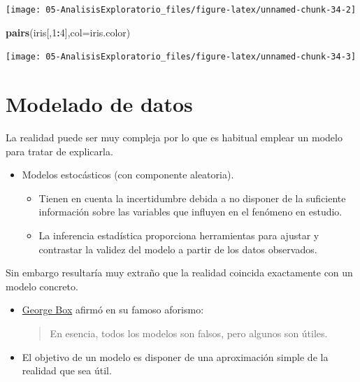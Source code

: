 \documentclass[]{book}
\newenvironment{Shaded}{\begin{snugshade}}{\end{snugshade}}
\newcommand{\KeywordTok}[1]{\textcolor[rgb]{0.13,0.29,0.53}{\textbf{#1}}}
\newcommand{\DataTypeTok}[1]{\textcolor[rgb]{0.13,0.29,0.53}{#1}}
\newcommand{\DecValTok}[1]{\textcolor[rgb]{0.00,0.00,0.81}{#1}}
\newcommand{\OperatorTok}[1]{\textcolor[rgb]{0.81,0.36,0.00}{\textbf{#1}}}
\newcommand{\NormalTok}[1]{#1}
\begin{document}
\begin{center}\texttt{[image: 05-AnalisisExploratorio\_files/figure-latex/unnamed-chunk-34-2]} \end{center}

\begin{Shaded}
\begin{Highlighting}[]
\KeywordTok{pairs}\NormalTok{(iris[,}\DecValTok{1}\OperatorTok{:}\DecValTok{4}\NormalTok{],}\DataTypeTok{col=}\NormalTok{iris.color)}
\end{Highlighting}
\end{Shaded}

\begin{center}\texttt{[image: 05-AnalisisExploratorio\_files/figure-latex/unnamed-chunk-34-3]} \end{center}

\chapter{Modelado de datos}\label{modelado-de-datos}

La realidad puede ser muy compleja por lo que es habitual emplear un
modelo para tratar de explicarla.

\begin{itemize}
\item
  Modelos estocásticos (con componente aleatoria).

  \begin{itemize}
  \item
    Tienen en cuenta la incertidumbre debida a no disponer de la
    suficiente información sobre las variables que influyen en el
    fenómeno en estudio.
  \item
    La inferencia estadística proporciona herramientas para ajustar y
    contrastar la validez del modelo a partir de los datos observados.
  \end{itemize}
\end{itemize}

Sin embargo resultaría muy extraño que la realidad coincida exactamente
con un modelo concreto.

\begin{itemize}
\item
  \href{https://en.wikipedia.org/wiki/George_E._P._Box}{George Box}
  afirmó en su famoso aforismo:

  \begin{quote}
  En esencia, todos los modelos son falsos, pero algunos son útiles.
  \end{quote}
\item
  El objetivo de un modelo es disponer de una aproximación simple de la
  realidad que sea útil.
\end{itemize}
\end{document}
